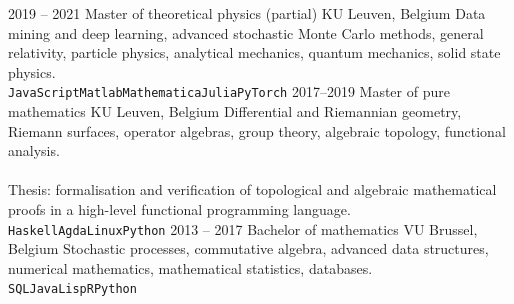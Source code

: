\documentclass[9pt]{developercv} %
\begin{document}
\begin{entrylist}
	\entry
		{2019 -- 2021}
		{Master of theoretical physics (partial)}
		{KU Leuven, Belgium}
		{Data mining and deep learning, advanced stochastic Monte Carlo methods, general relativity, particle physics, analytical mechanics, quantum mechanics, solid state physics.\\ \texttt{JavaScript}\slashsep\texttt{Matlab}\slashsep\texttt{Mathematica}\slashsep\texttt{Julia}\slashsep\texttt{PyTorch}}
	\entry
		{2017--2019}
		{Master of pure mathematics}
		{KU Leuven, Belgium}
		{
		Differential and Riemannian geometry, Riemann surfaces, operator algebras, group theory, algebraic topology, functional analysis.
		\\
		\\Thesis: formalisation and verification of topological and algebraic mathematical proofs in a high-level functional programming language.\\   \texttt{Haskell}\slashsep\texttt{Agda}\slashsep\texttt{Linux}\slashsep\texttt{Python}}
	\entry
		{2013 -- 2017}
		{Bachelor of mathematics}
		{VU Brussel, Belgium}
		{Stochastic processes, commutative algebra, advanced data structures, numerical mathematics, mathematical statistics, databases.\\   \texttt{SQL}\slashsep\texttt{Java}\slashsep\texttt{Lisp}\slashsep\texttt{R}\slashsep\texttt{Python}}
\end{entrylist}

\end{document}
